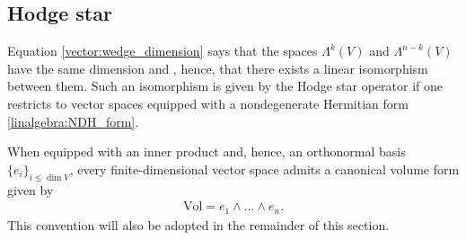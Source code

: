 \subsection{Hodge star}

    Equation \eqref{vector:wedge_dimension} says that the spaces $\Lambda^k(V)$ and $\Lambda^{n-k}(V)$ have the same dimension and , hence, that there exists a linear isomorphism between them. Such an isomorphism is given by the Hodge star operator if one restricts to vector spaces equipped with a nondegenerate Hermitian form \ref{linalgebra:NDH_form}.

    When equipped with an inner product and, hence, an orthonormal basis $\{e_i\}_{i\leq\dim V}$, every finite-dimensional vector space admits a canonical volume form given by
    \begin{gather}
        \mathrm{Vol} = e_1\wedge\ldots\wedge e_n.
    \end{gather}
    This convention will also be adopted in the remainder of this section.


